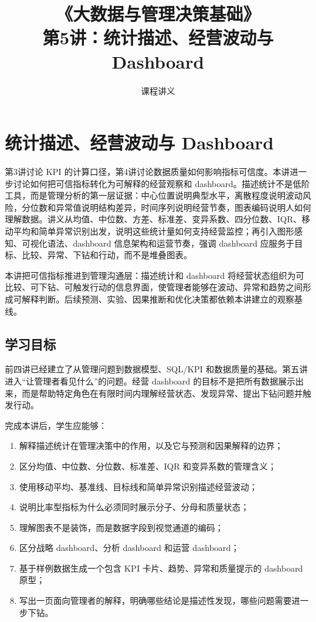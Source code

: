 \documentclass[UTF8,fontset=fandol,openany,zihao=-4]{ctexbook}
\title{《大数据与管理决策基础》\\[0.5em]\large 第5讲：统计描述、经营波动与 Dashboard}
\author{课程讲义}
\date{}
\begin{document}
\maketitle
\tableofcontents

\setcounter{chapter}{4}
\chapter{统计描述、经营波动与 Dashboard}
\label{ch:week05-statistics-dashboard}

\begin{chapterbox}
第3讲讨论 KPI 的计算口径，第4讲讨论数据质量如何影响指标可信度。本讲进一步讨论如何把可信指标转化为可解释的经营观察和 dashboard。描述统计不是低阶工具，而是管理分析的第一层证据：中心位置说明典型水平，离散程度说明波动风险，分位数和异常值说明结构差异，时间序列说明经营节奏，图表编码说明人如何理解数据。讲义从均值、中位数、方差、标准差、变异系数、四分位数、IQR、移动平均和简单异常识别出发，说明这些统计量如何支持经营监控；再引入图形感知、可视化语法、dashboard 信息架构和运营节奏，强调 dashboard 应服务于目标、比较、异常、下钻和行动，而不是堆叠图表。
\end{chapterbox}

\begin{modernbox}[课程接口]
本讲把可信指标推进到管理沟通层：描述统计和 dashboard 将经营状态组织为可比较、可下钻、可触发行动的信息界面，使管理者能够在波动、异常和趋势之间形成可解释判断。后续预测、实验、因果推断和优化决策都依赖本讲建立的观察基线。
\end{modernbox}

\section{学习目标}

前四讲已经建立了从管理问题到数据模型、SQL/KPI 和数据质量的基础。第五讲进入“让管理者看见什么”的问题。经营 dashboard 的目标不是把所有数据展示出来，而是帮助特定角色在有限时间内理解经营状态、发现异常、提出下钻问题并触发行动。

完成本讲后，学生应能够：
\begin{enumerate}
  \item 解释描述统计在管理决策中的作用，以及它与预测和因果解释的边界；
  \item 区分均值、中位数、分位数、标准差、IQR 和变异系数的管理含义；
  \item 使用移动平均、基准线、目标线和简单异常识别描述经营波动；
  \item 说明比率型指标为什么必须同时展示分子、分母和质量状态；
  \item 理解图表不是装饰，而是数据字段到视觉通道的编码；
  \item 区分战略 dashboard、分析 dashboard 和运营 dashboard；
  \item 基于样例数据生成一个包含 KPI 卡片、趋势、异常和质量提示的 dashboard 原型；
  \item 写出一页面向管理者的解释，明确哪些结论是描述性发现，哪些问题需要进一步下钻。
\end{enumerate}
\end{document}
